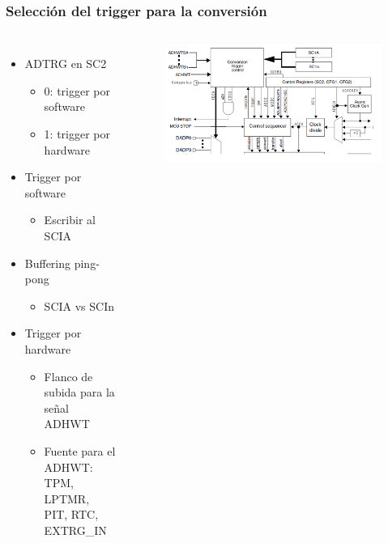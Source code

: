\documentclass[10.5pt,scale=1.0,t,aspectratio=169,hyperref={pdfpagelabels=false}]{beamer}
\begin{document}
\begin{frame}
	\frametitle{Selección del trigger para la conversión}
	{\small
		\begin{columns}
			\begin{itemize}
				\item ADTRG en SC2
				\begin{itemize}
					\item 0: trigger por software
					\item 1: trigger por hardware
				\end{itemize}
				\item Trigger por software
				\begin{itemize}
					\item Escribir al SCIA
				\end{itemize}
				\item Buffering ping-pong
				\begin{itemize}
					\item SCIA vs SCIn
				\end{itemize}
				\item Trigger por hardware
				\begin{itemize}
					\item Flanco de subida para la señal ADHWT
					\item Fuente para el ADHWT: TPM, LPTMR, PIT, RTC, EXTRG\_IN
				\end{itemize}
			\end{itemize}
			
			\begin{figure}
				\centering
				\includegraphics[scale=0.4]{fig_Trigger}
			\end{figure}
		\end{columns}
	}
\end{frame}
\end{document}
